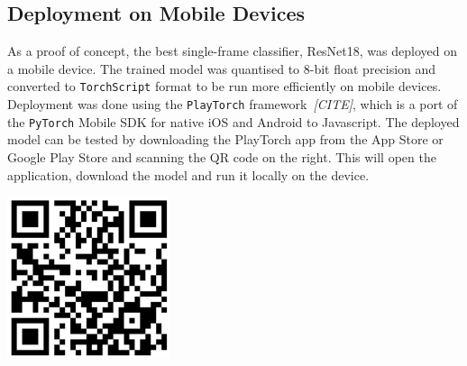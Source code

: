\documentclass[a4paper]{article}
\begin{document}

\subsection{Deployment on Mobile Devices}
\label{sub:deploment}

\begin{minipage}{0.6\textwidth}

As a proof of concept, the best single-frame classifier, ResNet18, was
deployed on a mobile device. The trained model was quantised to 8-bit float
precision and converted to \texttt{TorchScript} format to be run more
efficiently on mobile devices. Deployment was done using the
\texttt{PlayTorch} framework~\textit{[CITE]}, which is a port of the
\texttt{PyTorch}
Mobile SDK for native iOS and Android to Javascript. The deployed model can
be tested by downloading the PlayTorch app from the App Store or Google Play
Store and scanning the QR code on the right. This will open the application,
download the model and run it locally on the device.

\end{minipage}
\hfill
\begin{minipage}{0.35\textwidth}

\includegraphics[width=\linewidth]{./figures/playtorch-qr.png}

\end{minipage}%
\end{document}
